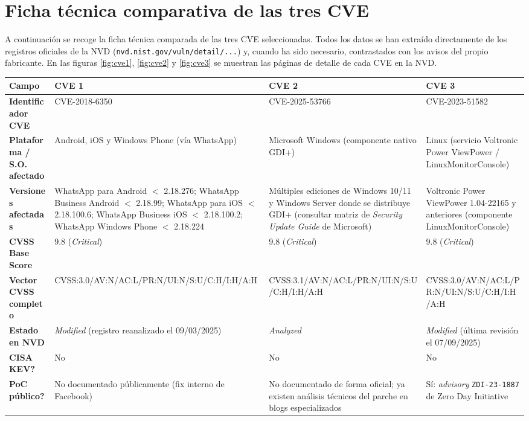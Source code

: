 \chapter{Ficha técnica comparativa de las tres CVE}

A continuación se recoge la ficha técnica comparada de las tres CVE seleccionadas. Todos los datos se han extraído directamente de los registros oficiales de la NVD (\texttt{nvd.nist.gov/vuln/detail/...}) y, cuando ha sido necesario, contrastados con los avisos del propio fabricante. En las figuras \ref{fig:cve1}, \ref{fig:cve2} y \ref{fig:cve3} se muestran las páginas de detalle de cada CVE en la NVD.

\begin{table}[H]
\centering
\renewcommand{\arraystretch}{1.35}
\footnotesize
\begin{tabularx}{\textwidth}{|>{\bfseries}p{3.6cm}|X|X|X|}
\hline
\rowcolor{lightblue}
\textbf{Campo} & \textbf{CVE 1} & \textbf{CVE 2} & \textbf{CVE 3} \\ \hline
Identificador CVE & CVE-2018-6350 & CVE-2025-53766 & CVE-2023-51582 \\ \hline
Plataforma / S.O. afectado & Android, iOS y Windows Phone (vía WhatsApp) & Microsoft Windows (componente nativo GDI+) & Linux (servicio Voltronic Power ViewPower / LinuxMonitorConsole) \\ \hline
Versiones afectadas & WhatsApp para Android $<$ 2.18.276; WhatsApp Business Android $<$ 2.18.99; WhatsApp para iOS $<$ 2.18.100.6; WhatsApp Business iOS $<$ 2.18.100.2; WhatsApp Windows Phone $<$ 2.18.224 & Múltiples ediciones de Windows 10/11 y Windows Server donde se distribuye GDI+ (consultar matriz de \textit{Security Update Guide} de Microsoft) & Voltronic Power ViewPower 1.04-22165 y anteriores (componente LinuxMonitorConsole) \\ \hline
CVSS Base Score & 9.8 (\textit{Critical}) & 9.8 (\textit{Critical}) & 9.8 (\textit{Critical}) \\ \hline
Vector CVSS completo & CVSS:3.0/AV:N/AC:L/PR:N\-/UI:N/S:U/C:H/I:H/A:H & CVSS:3.1/AV:N/AC:L/PR:N\-/UI:N/S:U/C:H/I:H/A:H & CVSS:3.0/AV:N/AC:L/PR:N\-/UI:N/S:U/C:H/I:H/A:H \\ \hline
Estado en NVD & \textit{Modified} (registro reanalizado el 09/03/2025) & \textit{Analyzed} & \textit{Modified} (última revisión el 07/09/2025) \\ \hline
\textquestiondown{}CISA KEV? & No & No & No \\ \hline
\textquestiondown{}PoC público? & No documentado públicamente (fix interno de Facebook) & No documentado de forma oficial; ya existen análisis técnicos del parche en blogs especializados & Sí: \textit{advisory} \texttt{ZDI-23-1887} de Zero Day Initiative \\ \hline

\end{tabularx}
\end{table}
